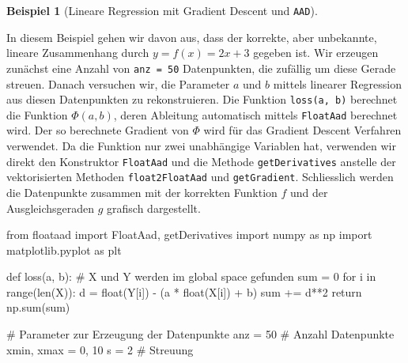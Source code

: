\documentclass[
  a4paper,
  DIV=11]{scrreprt}
\newenvironment{Shaded}{\begin{snugshade}}{\end{snugshade}}
\newcommand{\BuiltInTok}[1]{\textcolor[rgb]{0.00,0.23,0.31}{#1}}
\newcommand{\CommentTok}[1]{\textcolor[rgb]{0.37,0.37,0.37}{#1}}
\newcommand{\ControlFlowTok}[1]{\textcolor[rgb]{0.00,0.23,0.31}{#1}}
\newcommand{\DecValTok}[1]{\textcolor[rgb]{0.68,0.00,0.00}{#1}}
\newcommand{\ImportTok}[1]{\textcolor[rgb]{0.00,0.46,0.62}{#1}}
\newcommand{\KeywordTok}[1]{\textcolor[rgb]{0.00,0.23,0.31}{#1}}
\newcommand{\NormalTok}[1]{\textcolor[rgb]{0.00,0.23,0.31}{#1}}
\newcommand{\OperatorTok}[1]{\textcolor[rgb]{0.37,0.37,0.37}{#1}}
\theoremstyle{definition}
\theoremstyle{definition}
\newtheorem{example}{Beispiel}[chapter]
\theoremstyle{remark}
\begin{document}
\begin{example}[Lineare Regression mit Gradient Descent und
\texttt{AAD}]\protect\hypertarget{exm-LinearRegressionWithGradientDescent}{}\label{exm-LinearRegressionWithGradientDescent}

In diesem Beispiel gehen wir davon aus, dass der korrekte, aber
unbekannte, lineare Zusammenhang durch \(y = f(x) = 2x+3\) gegeben ist.
Wir erzeugen zunächst eine Anzahl von \texttt{anz\ =\ 50} Datenpunkten,
die zufällig um diese Gerade streuen. Danach versuchen wir, die
Parameter \(a\) und \(b\) mittels linearer Regression aus diesen
Datenpunkten zu rekonstruieren. Die Funktion \texttt{loss(a,\ b)}
berechnet die Funktion \(\Phi(a,b)\), deren Ableitung automatisch
mittels \texttt{FloatAad} berechnet wird. Der so berechnete Gradient von
\(\Phi\) wird für das Gradient Descent Verfahren verwendet. Da die
Funktion nur zwei unabhängige Variablen hat, verwenden wir direkt den
Konstruktor \texttt{FloatAad} und die Methode \texttt{getDerivatives}
anstelle der vektorisierten Methoden \texttt{float2FloatAad} und
\texttt{getGradient}. Schliesslich werden die Datenpunkte zusammen mit
der korrekten Funktion \(f\) und der Ausgleichsgeraden \(g\) grafisch
dargestellt.

\begin{Shaded}
\begin{Highlighting}[]
\ImportTok{from}\NormalTok{ floataad }\ImportTok{import}\NormalTok{ FloatAad, getDerivatives}
\ImportTok{import}\NormalTok{ numpy }\ImportTok{as}\NormalTok{ np}
\ImportTok{import}\NormalTok{ matplotlib.pyplot }\ImportTok{as}\NormalTok{ plt}

\KeywordTok{def}\NormalTok{ loss(a, b):}
    \CommentTok{\# X und Y werden im global space gefunden}
    \BuiltInTok{sum} \OperatorTok{=} \DecValTok{0}
    \ControlFlowTok{for}\NormalTok{ i }\KeywordTok{in} \BuiltInTok{range}\NormalTok{(}\BuiltInTok{len}\NormalTok{(X)):}
\NormalTok{        d }\OperatorTok{=} \BuiltInTok{float}\NormalTok{(Y[i]) }\OperatorTok{{-}}\NormalTok{ (a }\OperatorTok{*} \BuiltInTok{float}\NormalTok{(X[i]) }\OperatorTok{+}\NormalTok{ b)}
        \BuiltInTok{sum} \OperatorTok{+=}\NormalTok{ d}\OperatorTok{**}\DecValTok{2}
    \ControlFlowTok{return}\NormalTok{ np.}\BuiltInTok{sum}\NormalTok{(}\BuiltInTok{sum}\NormalTok{)}
    

\CommentTok{\# Parameter zur Erzeugung der Datenpunkte}
\NormalTok{anz }\OperatorTok{=} \DecValTok{50} \CommentTok{\# Anzahl Datenpunkte}
\NormalTok{xmin, xmax }\OperatorTok{=} \DecValTok{0}\NormalTok{, }\DecValTok{10}
\NormalTok{s }\OperatorTok{=} \DecValTok{2}    \CommentTok{\# Streuung}


\end{Highlighting}
\end{Shaded}
\end{example}
\end{document}
